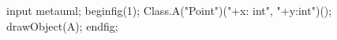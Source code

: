 \documentclass{article}
\begin{document}

\begin{mpost*}
input metauml;
beginfig(1);
    Class.A("Point")("+x: int", "+y:int")();
    drawObject(A);
endfig;
\end{mpost*}
\end{document}

